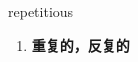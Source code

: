 
\begin{frame}
{\huge repetitious}
\begin{center}
\begin{enumerate}\Large
  \item \textbf{重复的，反复的}
\end{enumerate}
\end{center}
\end{frame}
